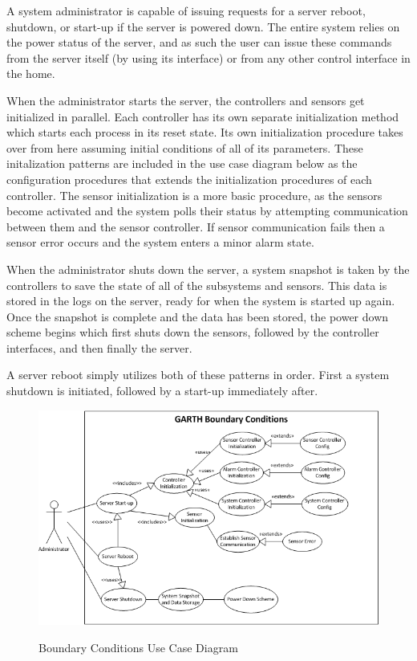 \documentclass{report}
\begin{document}
A system administrator is capable of issuing requests for a server reboot,
shutdown, or start-up if the server is powered down. The entire system relies
on the power status of the server, and as such the user can issue these
commands from the server itself (by using its interface) or from any other
control interface in the home.

When the administrator starts the server, the controllers and sensors get
initialized in parallel. Each controller has its own separate initialization
method which starts each process in its reset state. Its own initialization
procedure takes over from here assuming initial conditions of all of its
parameters. These initalization patterns are included in the use case diagram
below as the configuration procedures that extends the initialization
procedures of each controller. The sensor initialization is a more basic
procedure, as the sensors become activated and the system polls their status by
attempting communication between them and the sensor controller. If sensor
communication fails then a sensor error occurs and the system enters a minor
alarm state.

When the administrator shuts down the server, a system snapshot is taken by the
controllers to save the state of all of the subsystems and sensors. This data
is stored in the logs on the server, ready for when the system is started up
again. Once the snapshot is complete and the data has been stored, the power
down scheme begins which first shuts down the sensors, followed by the
controller interfaces, and then finally the server.

A server reboot simply utilizes both of these patterns in order. First a system
shutdown is initiated, followed by a start-up immediately after.

\begin{figure}[hp]
    \centering
        \caption{Boundary Conditions Use Case Diagram}
        \scriptsize
        \setlength{\unitlength}{2.0em}
        \includegraphics{boundary_conditions.png}
        \normalsize
    \label{fig:boundary_conditions}
\end{figure}
\end{document}
